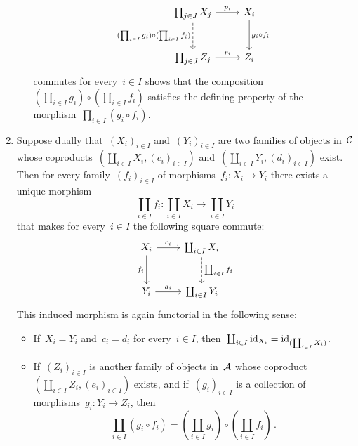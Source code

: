 \begin{remark*}
\begin{enumerate}
\begin{itemize}
          \[
            \begin{tikzcd}[row sep = large]
                \prod_{j \in J} X_j
                \arrow{r}[above]{p_i}
                \arrow[dashed]{d}[left]{(\prod_{i \in I} g_i) \circ (\prod_{i \in I} f_i)}
              & X_i
                \arrow{d}[right]{g_i \circ f_i}
              \\
                \prod_{j \in J} Z_j
                \arrow{r}[above]{r_i}
              & Z_i
            \end{tikzcd}
          \]
          commutes for every~$i \in I$ shows that the composition~$(\prod_{i \in I} g_i) \circ (\prod_{i \in I} f_i)$ satisfies the defining property of the morphism~$\prod_{i \in I} (g_i \circ f_i)$.
      \end{itemize}
    \item
      Suppose dually that~$(X_i)_{i \in I}$ and~$(Y_i)_{i \in I}$ are two families of objects in~$\mathcal{C}$ whose coproducts~$(\coprod_{i \in I} X_i, (c_i)_{i \in I})$ and~$(\coprod_{i \in I} Y_i, (d_i)_{i \in I})$ exist.
      Then for every family~$(f_i)_{i \in I}$ of morphisms~$f_i \colon X_i \to Y_i$ there exists a unique morphism
      \[
        \coprod_{i \in I} f_i
        \colon
        \coprod_{i \in I} X_i
        \to
        \coprod_{i \in I} Y_i
      \]
      that makes for every~$i \in I$ the following square commute:
      \[
         \begin{tikzcd}[row sep = large]
            X_i
            \arrow{r}[above]{c_i}
            \arrow{d}[left]{f_i}
          & \coprod_{i \in I} X_i
            \arrow[dashed]{d}[right]{\coprod_{i \in I} f_i}
          \\
            Y_i
            \arrow{r}[above]{d_i}
          & \coprod_{i \in I} Y_i
        \end{tikzcd}
      \]
      This induced morphism is again functorial in the following sense:
      \begin{itemize}
        \item
          If~$X_i = Y_i$ and~$c_i = d_i$ for every~$i \in I$, then~$\coprod_{i \in I} \operatorname{id}_{X_i} = \operatorname{id}_{(\coprod_{i \in I} X_i)}$.
        \item
          If~$(Z_i)_{i \in I}$ is another family of objects in~$\mathcal{A}$ whose coproduct~$(\coprod_{i \in I} Z_i, (e_i)_{i \in I})$ exists, and if~$(g_i)_{i \in I}$ is a collection of morphisms~$g_i \colon Y_i \to Z_i$, then
          \[
              \coprod_{i \in I} (g_i \circ f_i)
            =       \left( \coprod_{i \in I} g_i \right)
              \circ \left( \coprod_{i \in I} f_i \right) \,.
          \]
      \end{itemize}
  \end{enumerate}
\end{remark*}




